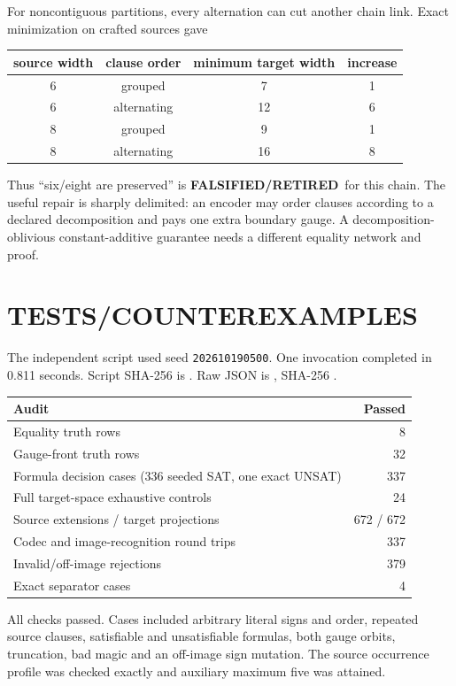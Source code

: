 \documentclass[11pt]{article}
\newcommand{\RET}{\textbf{FALSIFIED/RETIRED}}
\begin{document}
For noncontiguous partitions, every alternation can cut another chain link.
Exact minimization on crafted sources gave
\begin{center}
\begin{tabular}{cccc}
\toprule
source width & clause order & minimum target width & increase\\
\midrule
6 & grouped & 7 & 1\\
6 & alternating & 12 & 6\\
8 & grouped & 9 & 1\\
8 & alternating & 16 & 8\\
\bottomrule
\end{tabular}
\end{center}
Thus ``six/eight are preserved'' is \RET\ for this chain.  The useful repair is
sharply delimited: an encoder may order clauses according to a declared
decomposition and pays one extra boundary gauge.  A decomposition-oblivious
constant-additive guarantee needs a different equality network and proof.

\section{TESTS/COUNTEREXAMPLES}
The independent script
 used seed
\texttt{202610190500}.  One invocation completed in 0.811 seconds.  Script
SHA-256 is
.
Raw JSON is
, SHA-256
.

\begin{center}
\begin{tabular}{lr}
\toprule
Audit & Passed\\
\midrule
Equality truth rows & 8\\
Gauge-front truth rows & 32\\
Formula decision cases (336 seeded SAT, one exact UNSAT) & 337\\
Full target-space exhaustive controls & 24\\
Source extensions / target projections & 672 / 672\\
Codec and image-recognition round trips & 337\\
Invalid/off-image rejections & 379\\
Exact separator cases & 4\\
\bottomrule
\end{tabular}
\end{center}
All checks passed.  Cases included arbitrary literal signs and order, repeated
source clauses, satisfiable and unsatisfiable formulas, both gauge orbits,
truncation, bad magic and an off-image sign mutation.  The source occurrence
profile was checked exactly and auxiliary maximum five was attained.
\end{document}
